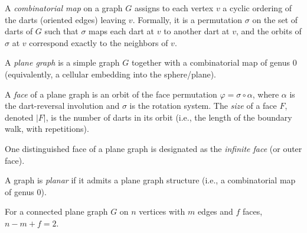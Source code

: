 \begin{definition}
  \label{def:comb_map}
  \notready
  A \emph{combinatorial map} on a graph $G$ assigns to each vertex $v$ a
  cyclic ordering of the darts (oriented edges) leaving $v$. Formally, it is
  a permutation $\sigma$ on the set of darts of $G$ such that $\sigma$ maps
  each dart at $v$ to another dart at $v$, and the orbits of $\sigma$ at $v$
  correspond exactly to the neighbors of $v$.
\end{definition}

\begin{definition}
  \label{def:plane_graph}
  \notready
  A \emph{plane graph} is a simple graph $G$ together with a combinatorial
  map of genus $0$ (equivalently, a cellular embedding into the sphere/plane).
\end{definition}

\begin{definition}[Face]
  \label{def:face}
  \notready
  A \emph{face} of a plane graph is an orbit of the face permutation
  $\varphi = \sigma \circ \alpha$, where $\alpha$ is the dart-reversal
  involution and $\sigma$ is the rotation system. The \emph{size} of a face
  $F$, denoted $|F|$, is the number of darts in its orbit (i.e., the length
  of the boundary walk, with repetitions).
\end{definition}

\begin{definition}
  \label{def:outer_face}
  \notready
  One distinguished face of a plane graph is designated as the \emph{infinite
  face} (or outer face).
\end{definition}

\begin{definition}
  \label{def:is_planar}
  \notready
  A graph is \emph{planar} if it admits a plane graph structure (i.e., a
  combinatorial map of genus $0$).
\end{definition}

\begin{theorem}
  \label{thm:euler_formula}
  \notready
  For a connected plane graph $G$ on $n$ vertices with $m$ edges and $f$
  faces, $n - m + f = 2$.
\end{theorem}


